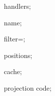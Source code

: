 %
%




{

  \attribute handlers;
  
  \attribute name;
  
  \attribute filter=\pgfdvnamedvisualizerfilter;
    
  \attribute positions;
  
  \attribute cache;
  
  \attribute projection code;
  
}

